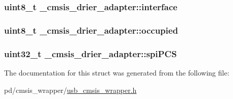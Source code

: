 \hypertarget{struct__cmsis__drier__adapter_a51a572fa7a648387cf481b45b862457c}{
\subsubsection[{interface}]{\setlength{\rightskip}{0pt plus 5cm}uint8\-\_\-t \-\_\-cmsis\-\_\-drier\-\_\-adapter\-::interface}}\label{struct__cmsis__drier__adapter_a51a572fa7a648387cf481b45b862457c}
\hypertarget{struct__cmsis__drier__adapter_ad4d980a94b8a1c3d88331a2577435db4}{
\subsubsection[{occupied}]{\setlength{\rightskip}{0pt plus 5cm}uint8\-\_\-t \-\_\-cmsis\-\_\-drier\-\_\-adapter\-::occupied}}\label{struct__cmsis__drier__adapter_ad4d980a94b8a1c3d88331a2577435db4}
\hypertarget{struct__cmsis__drier__adapter_ac81cbf4cbf2ee30a3f3a74b39a6d8780}{
\subsubsection[{spi\-P\-C\-S}]{\setlength{\rightskip}{0pt plus 5cm}uint32\-\_\-t \-\_\-cmsis\-\_\-drier\-\_\-adapter\-::spi\-P\-C\-S}}\label{struct__cmsis__drier__adapter_ac81cbf4cbf2ee30a3f3a74b39a6d8780}


The documentation for this struct was generated from the following file\-:\begin{DoxyCompactItemize}
\item 
pd/cmsis\-\_\-wrapper/\hyperlink{usb__cmsis__wrapper_8h}{usb\-\_\-cmsis\-\_\-wrapper.\-h}\end{DoxyCompactItemize}

